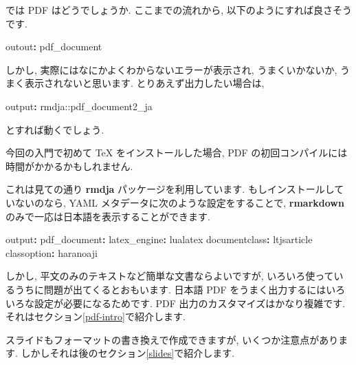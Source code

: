 \documentclass[
]{ltjsarticle}
\newenvironment{Shaded}{\begin{snugshade}}{\end{snugshade}}
\newcommand{\AttributeTok}[1]{\textcolor[rgb]{0.77,0.63,0.00}{#1}}
\newcommand{\FunctionTok}[1]{\textcolor[rgb]{0.00,0.00,0.00}{#1}}
\newcommand{\KeywordTok}[1]{\textcolor[rgb]{0.13,0.29,0.53}{\textbf{#1}}}
\newenvironment{infobox}[1]{\begin{itemize}\renewcommand{\labelitemi}{\raisebox{-.7\height}[0pt][0pt]{%
  {\setkeys{Gin}{width=3em,keepaspectratio}\texttt{[image: \_latex/\_img/\#1]}}}}
  \setlength{\fboxsep}{1em}
  \begin{greyblock}
  \item
  }{\end{greyblock}\end{itemize}
}
\begin{document}
では PDF はどうでしょうか. ここまでの流れから, 以下のようにすれば良さそうです.

\begin{Shaded}
\begin{Highlighting}[]
\FunctionTok{outout}\KeywordTok{:}\AttributeTok{ pdf\_document}
\end{Highlighting}
\end{Shaded}

しかし, 実際にはなにかよくわからないエラーが表示され, うまくいかないか, うまく表示されないと思います. とりあえず出力したい場合は,

\begin{Shaded}
\begin{Highlighting}[]
\FunctionTok{output}\KeywordTok{:}\AttributeTok{ rmdja::pdf\_document2\_ja}
\end{Highlighting}
\end{Shaded}

とすれば動くでしょう.

\begin{infobox}{important}
今回の入門で初めて TeX をインストールした場合, PDF の初回コンパイルには時間がかかるかもしれません.

\end{infobox}

これは見ての通り \textbf{rmdja} パッケージを利用しています. もしインストールしていないのなら, YAML メタデータに次のような設定をすることで, \textbf{rmarkdown} のみで一応は日本語を表示することができます.

\begin{Shaded}
\begin{Highlighting}[]
\FunctionTok{output}\KeywordTok{:}
\AttributeTok{  }\FunctionTok{pdf\_document}\KeywordTok{:}
\AttributeTok{    }\FunctionTok{latex\_engine}\KeywordTok{:}\AttributeTok{ lualatex}
\FunctionTok{documentclass}\KeywordTok{:}\AttributeTok{ ltjsarticle}
\FunctionTok{classoption}\KeywordTok{:}\AttributeTok{ haranoaji}
\end{Highlighting}
\end{Shaded}

しかし, 平文のみのテキストなど簡単な文書ならよいですが, いろいろ使っているうちに問題が出てくるとおもいます. 日本語 PDF をうまく出力するにはいろいろな設定が必要になるためです. PDF 出力のカスタマイズはかなり複雑です. それはセクション\ref{pdf-intro}で紹介します.

スライドもフォーマットの書き換えで作成できますが, いくつか注意点があります. しかしそれは後のセクション\ref{slides}で紹介します.
\end{document}
